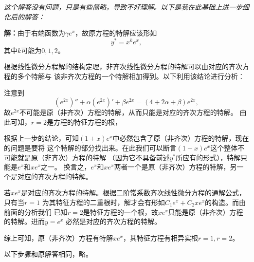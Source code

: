	{\it 这个解答没有问题，只是有些简略，导致不好理解。以下是我在此基础上进一步细化后的解答：}
	
	{\bf 解：}由于右端函数为$\gamma e^x$，故原方程的特解应该形如
	$$y^*=x^ke^x,$$
	其中$k$可能为$0,1,2$。
	
	根据线性微分方程解的结构定理，非齐次线性微分方程的特解可以由对应的齐次方程的多个特解与
	该非齐次方程的一个特解相加得到。以下利用该结论进行分析：
	
	注意到
	$$(e^{2x})''+\alpha(e^{2x})'+\beta e^{2x}
	=(4+2\alpha+\beta)e^{2x},$$
	故$e^{2x}$不可能是原（非齐次）方程的特解，从而只能是对应的齐次方程的特解。
	由此可知，$r=2$是方程的特征方程的根，
	
	根据上一步的结论，可知$(1+x)e^x$中必然包含了原（非齐次）方程的特解，现在的问题是要将
	这个特解的部分找出来。在此我们可以断言$(1+x)e^x$这个整体不可能就是原（非齐次）方程的特解
	（因为它不具备前述$y^*$所应有的形式），特解只能是$e^x$和$xe^x$之一。
	换言之，$e^x$和$xe^x$两者一个是原（非齐次）方程的特解，另一个是对应的齐次方程的特解。
	
	若$xe^x$是对应的齐次方程的特解。根据二阶常系数齐次线性微分方程的通解公式，只有当$r=1$
	为其特征方程的二重根时，解才会有形如$C_1e^x+C_2xe^x$的构造。而由前面的分析我们
	已知$r=2$是特征方程的一个根，故$xe^x$只能是原（非齐次）方程的特解。进而$y=e^x$
	必然是对应的齐次方程的特解。
	
	综上可知，原（非齐次）方程有特解$xe^x$，其特征方程有相异实根$r=1,r=2$。
	
	以下步骤和原解答相同，略。
	
